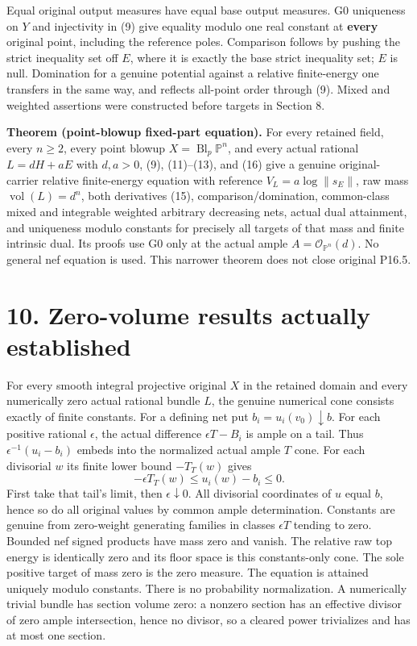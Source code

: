 \documentclass[
  10pt,
]{article}
\begin{document}
Equal original output measures have equal base output measures. G0
uniqueness on \(Y\) and injectivity in (9) give equality modulo one real
constant at \textbf{every} original point, including the reference
poles. Comparison follows by pushing the strict inequality set off
\(E\), where it is exactly the base strict inequality set; \(E\) is
null. Domination for a genuine potential against a relative
finite-energy one transfers in the same way, and reflects all-point
order through (9). Mixed and weighted assertions were constructed before
targets in Section 8.

\textbf{Theorem (point-blowup fixed-part equation).} For every retained
field, every \(n\ge2\), every point blowup
\(X=\operatorname{Bl}_p\mathbb P^n\), and every actual rational
\(L=dH+aE\) with \(d,a>0\), (9), (11)--(13), and (16) give a genuine
original-carrier relative finite-energy equation with reference
\(V_L=a\log\|s_E\|\), raw mass \(\operatorname{vol}(L)=d^n\), both
derivatives (15), comparison/domination, common-class mixed and
integrable weighted arbitrary decreasing nets, actual dual attainment,
and uniqueness modulo constants for precisely all targets of that mass
and finite intrinsic dual. Its proofs use G0 only at the actual ample
\(A=\mathcal O_{\mathbb P^n}(d)\). No general nef equation is used. This
narrower theorem does not close original P16.5.

\section{10. Zero-volume results actually
established}\label{zero-volume-results-actually-established}

For every smooth integral projective original \(X\) in the retained
domain and every numerically zero actual rational bundle \(L\), the
genuine numerical cone consists exactly of finite constants. For a
defining net put \(b_i=u_i(v_0)\downarrow b\). For each positive
rational \(\epsilon\), the actual difference \(\epsilon T-B_i\) is ample
on a tail. Thus \(\epsilon^{-1}(u_i-b_i)\) embeds into the normalized
actual ample \(T\) cone. For each divisorial \(w\) its finite lower
bound \(-T_T(w)\) gives \[-\epsilon T_T(w)\le u_i(w)-b_i\le0.\] First
take that tail's limit, then \(\epsilon\downarrow0\). All divisorial
coordinates of \(u\) equal \(b\), hence so do all original values by
common ample determination. Constants are genuine from zero-weight
generating families in classes \(\epsilon T\) tending to zero. Bounded
nef signed products have mass zero and vanish. The relative raw top
energy is identically zero and its floor space is this constants-only
cone. The sole positive target of mass zero is the zero measure. The
equation is attained uniquely modulo constants. There is no probability
normalization. A numerically trivial bundle has section volume zero: a
nonzero section has an effective divisor of zero ample intersection,
hence no divisor, so a cleared power trivializes and has at most one
section.
\end{document}

